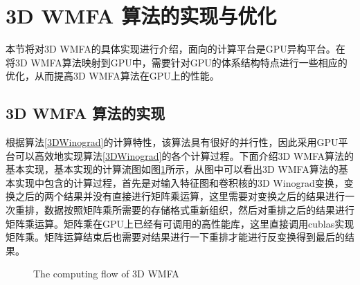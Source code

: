 \section{3D WMFA 算法的实现与优化}
本节将对3D WMFA的具体实现进行介绍，面向的计算平台是GPU异构平台。在将3D WMFA算法映射到GPU中，需要针对GPU的体系结构特点进行一些相应的优化，从而提高3D WMFA算法在GPU上的性能。

\subsection{3D WMFA 算法的实现}
\label{baselineIm}
根据算法\ref{3DWinograd}的计算特性，该算法具有很好的并行性，因此采用GPU平台可以高效地实现算法\ref{3DWinograd}的各个计算过程。下面介绍3D WMFA算法的基本实现，基本实现的计算流图如图\ref{computeflow}所示，从图中可以看出3D WMFA算法的基本实现中包含的计算过程，首先是对输入特征图和卷积核的3D Winograd变换，变换之后的两个结果并没有直接进行矩阵乘运算，这里需要对变换之后的结果进行一次重排，数据按照矩阵乘所需要的存储格式重新组织，然后对重排之后的结果进行矩阵乘运算。矩阵乘在GPU上已经有可调用的高性能库，这里直接调用cublas实现矩阵乘。矩阵运算结束后也需要对结果进行一下重排才能进行反变换得到最后的结果。
\begin{figure}[tbh]%
\centering
{}
\caption{The computing flow of 3D WMFA}
\label{computeflow}
\end{figure}

